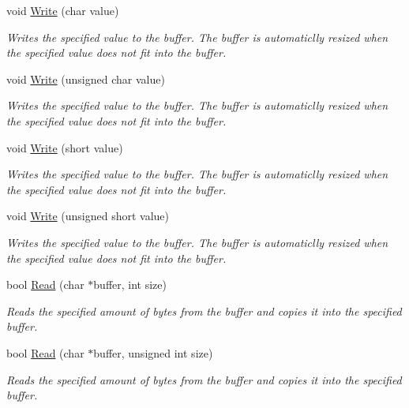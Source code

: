 \begin{DoxyCompactItemize}
void \hyperlink{class_senergy_1_1_byte_buffer_add80584faab29bcadcb437b45ad97a87}{Write} (char value)
\begin{DoxyCompactList}\small\item\em Writes the specified value to the buffer. The buffer is automaticlly resized when the specified value does not fit into the buffer. \end{DoxyCompactList}\item 
void \hyperlink{class_senergy_1_1_byte_buffer_a061fe3c4158ba940e68bf4545639561e}{Write} (unsigned char value)
\begin{DoxyCompactList}\small\item\em Writes the specified value to the buffer. The buffer is automaticlly resized when the specified value does not fit into the buffer. \end{DoxyCompactList}\item 
void \hyperlink{class_senergy_1_1_byte_buffer_ae0e9d53b9afa8b098eed7b517a60b938}{Write} (short value)
\begin{DoxyCompactList}\small\item\em Writes the specified value to the buffer. The buffer is automaticlly resized when the specified value does not fit into the buffer. \end{DoxyCompactList}\item 
void \hyperlink{class_senergy_1_1_byte_buffer_a9286d05c71ce66859098778f11be9c51}{Write} (unsigned short value)
\begin{DoxyCompactList}\small\item\em Writes the specified value to the buffer. The buffer is automaticlly resized when the specified value does not fit into the buffer. \end{DoxyCompactList}\item 
bool \hyperlink{class_senergy_1_1_byte_buffer_ae4e73e6e193bec7b9f7df0919d1641d9}{Read} (char $\ast$buffer, int size)
\begin{DoxyCompactList}\small\item\em Reads the specified amount of bytes from the buffer and copies it into the specified buffer. \end{DoxyCompactList}\item 
bool \hyperlink{class_senergy_1_1_byte_buffer_ace3d04d38706d534a16e596ee291630b}{Read} (char $\ast$buffer, unsigned int size)
\begin{DoxyCompactList}\small\item\em Reads the specified amount of bytes from the buffer and copies it into the specified buffer. \end{DoxyCompactList}\item 

\end{DoxyCompactItemize}
